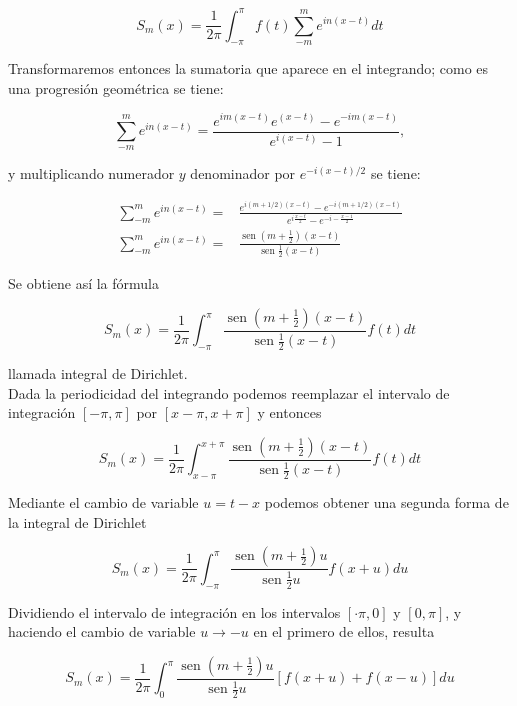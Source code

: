 \documentclass[10pt]{article}
\theoremstyle{plain}
\theoremstyle{definition}
\theoremstyle{remark}
\begin{document}
$$
S_{m}(x)=\frac{1}{2 \pi} \int_{-\pi}^{\pi} f(t) \sum_{-m}^{m} e^{i n(x-t)} d t
$$

Transformaremos entonces la sumatoria que aparece en el integrando; como es una progresión geométrica se tiene:

$$
\sum_{-m}^{m} e^{i n(x-t)}=\frac{e^{i m(x-t)} e^{(x-t)}-e^{-i m(x-t)}}{e^{i(x-t)}-1},
$$

y multiplicando numerador $y$ denominador por $e^{-i(x-t) / 2}$ se tiene:

$$
\begin{aligned}
\sum_{-m}^{m} e^{i n(x-t)}= & \frac{e^{i(m+1 / 2)(x-t)}-e^{-i(m+1 / 2)(x-t)}}{e^{i \frac{x-t}{2}}-e^{-i-\frac{x-1}{2}}} \\
\sum_{-m}^{m} e^{i n(x-t)}= & \frac{\operatorname{sen}\left(m+\frac{1}{2}\right)(x-t)}{\operatorname{sen} \frac{1}{2}(x-t)}
\end{aligned}
$$

Se obtiene así la fórmula


\begin{equation*}
S_{m}(x)=\frac{1}{2 \pi} \int_{-\pi}^{\pi} \frac{\operatorname{sen}\left(m+\frac{1}{2}\right)(x-t)}{\operatorname{sen} \frac{1}{2}(x-t)} f(t) d t \tag{5-15}
\end{equation*}


llamada integral de Dirichlet.\\
Dada la periodicidad del integrando podemos reemplazar el intervalo de integración $[-\pi, \pi]$ por $[x-\pi, x+\pi]$ y entonces

$$
S_{m}(x)=\frac{1}{2 \pi} \int_{x-\pi}^{x+\pi} \frac{\operatorname{sen}\left(m+\frac{1}{2}\right)(x-t)}{\operatorname{sen} \frac{1}{2}(x-t)} f(t) d t
$$

Mediante el cambio de variable $u=t-x$ podemos obtener una segunda forma de la integral de Dirichlet


\begin{equation*}
S_{m}(x)=\frac{1}{2 \pi} \int_{-\pi}^{\pi} \frac{\operatorname{sen}\left(m+\frac{1}{2}\right) u}{\operatorname{sen} \frac{1}{2} u} f(x+u) d u \tag{5-16}
\end{equation*}


Dividiendo el intervalo de integración en los intervalos $[\cdot \pi, 0]$ y $[0, \pi]$, y haciendo el cambio de variable $u \rightarrow-u$ en el primero de ellos, resulta


\begin{equation*}
S_{m}(x)=\frac{1}{2 \pi} \int_{0}^{\pi} \frac{\operatorname{sen}\left(m+\frac{1}{2}\right) u}{\operatorname{sen} \frac{1}{2} u}[f(x+u)+f(x-u)] d u \tag{5-17}
\end{equation*}
\end{document}
